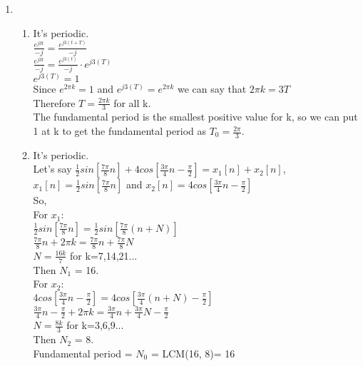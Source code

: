 \documentclass[10pt,a4paper, margin=1in]{article}
\begin{document}
\begin{enumerate}
\item %
    \begin{enumerate}   
    \item It's periodic.\\
    $\frac{e^{j3t}}{-j} = \frac{e^{j3(t+T)}}{-j}$ \\
    $\frac{e^{j3t}}{-j} = \frac{e^{j3(t)}}{-j}\cdot e^{j3(T)}$ \\
    $e^{j3(T)}=1$ \\
    Since $e^{2\pi k} = 1$ and $e^{j3(T)} = e^{2\pi k}$ we can say that $2\pi k = 3T$ \\
    Therefore $T = \frac{2\pi k}{3}$ for all k. \\
    The fundamental period is the smallest positive value for k, so we can put 1 at k to get the fundamental period as $T_0 = \frac{2\pi}{3}$.
    \item It's periodic.\\
    Let's say $\frac{1}{2}sin[\frac{7\pi}{8}n] + 4cos[\frac{3\pi}{4}n - \frac{\pi}{2}] = x_1[n] + x_2[n]$,\\
    $x_1[n] = \frac{1}{2}sin[\frac{7\pi}{8}n]$ and $x_2[n] = 4cos[\frac{3\pi}{4}n - \frac{\pi}{2}]$\\
    So,\\
    For $x_1$: \\
    $\frac{1}{2}sin[\frac{7\pi}{8}n] = \frac{1}{2}sin[\frac{7\pi}{8}(n+N)]$ \\
    $\frac{7\pi}{8}n + 2\pi k = \frac{7\pi}{8}n + \frac{7\pi}{8}N$ \\
    $N = \frac{16k}{7}$ for k=7,14,21... \\
    Then $N_1$ = 16. \\
    For $x_2$: \\
    $4cos[\frac{3\pi}{4}n - \frac{\pi}{2}] = 4cos[\frac{3\pi}{4}(n+N) - \frac{\pi}{2}]$ \\
    $\frac{3\pi}{4}n - \frac{\pi}{2} + 2\pi k = \frac{3\pi}{4}n + \frac{3\pi}{4}N - \frac{\pi}{2}$ \\
    $N = \frac{8k}{3}$ for k=3,6,9... \\
    Then $N_2$ = 8. \\
    Fundamental period = $N_0$ = LCM(16, 8)= 16
    \end{enumerate}


\end{enumerate}
\end{document}
